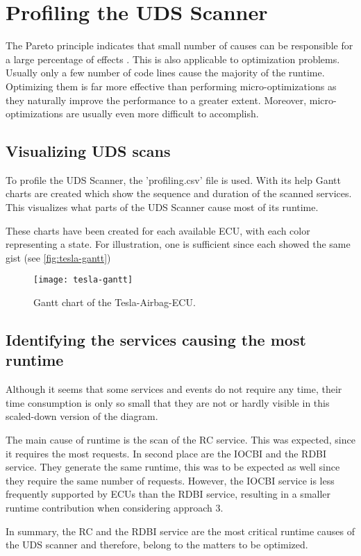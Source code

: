 \section{Profiling the UDS Scanner}

The Pareto principle indicates that small number of causes can be responsible for a large percentage of effects \cite{pareto}. 
This is also applicable to optimization problems. 
Usually only a few number of code lines cause the majority of the runtime. 
Optimizing them is far more effective than performing micro-optimizations as they naturally improve the performance to a greater extent. 
Moreover, micro-optimizations are usually even more difficult to accomplish.

\subsection{Visualizing UDS scans}

To profile the UDS Scanner, the 'profiling.csv' file is used. 
With its help Gantt charts are created which show the sequence and duration of the scanned services. 
This visualizes what parts of the UDS Scanner cause most of its runtime.

These charts have been created for each available ECU, with each color representing a state. 
For illustration, one is sufficient since each showed the same gist (see \autoref{fig:tesla-gantt})

\begin{figure}[H]
    \centering
    \texttt{[image: tesla-gantt]}
    \caption{Gantt chart of the Tesla-Airbag-ECU.}
    \label{fig:tesla-gantt}
\end{figure}


\subsection{Identifying the services causing the most runtime}

Although it seems that some services and events do not require any time, their time consumption is only so small that they are not or hardly visible in this scaled-down version of the diagram.

The main cause of runtime is the scan of the RC service. 
This was expected, since it requires the most requests.
In second place are the IOCBI and the RDBI service. 
They generate the same runtime, this was to be expected as well since they require the same number of requests. 
However, the IOCBI service is less frequently supported by ECUs than the RDBI service, resulting in a smaller runtime contribution when considering approach 3.

In summary, the RC and the RDBI service are the most critical runtime causes of the UDS scanner and therefore, belong to the matters to be optimized.
